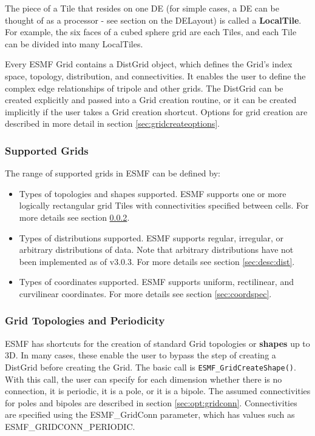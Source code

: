 The piece of a Tile that resides on one DE (for simple cases, a DE
can be thought of as a processor - see section on the DELayout)
is called a {\bf LocalTile}.  For example, the six faces of a cubed
sphere grid are each Tiles, and each Tile can be divided into many
LocalTiles.  

Every ESMF Grid contains a DistGrid object, which defines the Grid's
index space, topology, distribution, and connectivities.  It enables
the user to define the complex edge relationships of tripole and other
grids.  The DistGrid can be created explicitly and passed into a Grid
creation routine, or it can be created implicitly if the user takes
a Grid creation shortcut.  Options for grid creation are described in 
more detail in section \ref{sec:gridcreateoptions}.

\subsubsection{Supported Grids}

The range of supported grids in ESMF can be defined by:
\begin{itemize}
\item Types of topologies and shapes supported.  ESMF supports one or
more logically rectangular grid Tiles with connectivities specified
between cells.  For more details see section \ref{sec:ShapeShortcut}.
\item Types of distributions supported.  ESMF supports  regular,
irregular, or arbitrary distributions of data.  Note that arbitrary
distributions have not been implemented as of v3.0.3.
For more details see section \ref{sec:desc:dist}.
\item Types of coordinates supported.  ESMF supports uniform, rectilinear,
and curvilinear coordinates.  For more details see section \ref{sec:coordspec}.
\end{itemize}

\subsubsection{Grid Topologies and Periodicity}
\label{sec:ShapeShortcut}
ESMF has shortcuts for the creation of standard Grid topologies 
or {\bf shapes} up to 3D.  In many cases, these enable the user to
bypass the step of creating a DistGrid before creating the Grid.  The basic call is 
{\tt ESMF\_GridCreateShape()}.  With this call, the user can specify for
each dimension whether there is no connection, it is periodic, it
is a pole, or it is a bipole.  The assumed connectivities for poles and
bipoles are described in section \ref{sec:opt:gridconn}.  Connectivities
are specified using the ESMF\_GridConn parameter, which has values
such as ESMF\_GRIDCONN\_PERIODIC.

